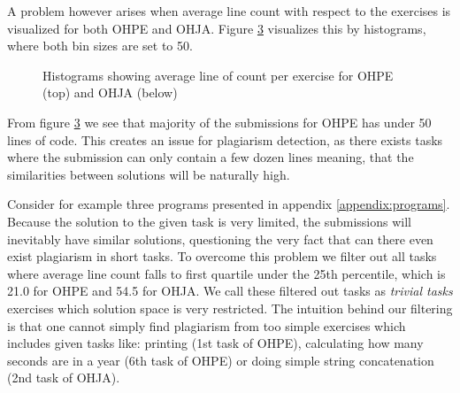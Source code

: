 \newpage

A problem however arises when average line count with respect to the exercises is visualized for both OHPE and OHJA. Figure \ref{fig-hists} visualizes this by histograms, where both bin sizes are set to 50. 


\begin{figure}[!h]
\centering
\captionsetup[subfigure]{justification=centering}

\begin{subfigure}{\textwidth}
    \setlength\figureheight{5cm}
    \setlength\figurewidth{\textwidth}
    
    \label{fig-ohpeavgloc}
\end{subfigure}

\begin{subfigure}{\textwidth}
  \setlength\figureheight{5cm}
    \setlength\figurewidth{\textwidth}
    
    \label{fig-ohjaavgloc}
\end{subfigure}

\caption[Two histograms for corpora]{Histograms showing average line of count per exercise for OHPE (top) and OHJA (below)}
\label{fig-hists}
\end{figure}

\noindent
From figure \ref{fig-hists} we see that majority of the submissions for OHPE has under 50 lines of code. This creates an issue for plagiarism detection, as there exists tasks where the submission can only contain a few dozen lines meaning, that the similarities between solutions will be naturally high. 

Consider for example three programs presented in appendix \ref{appendix:programs}. Because the solution to the given task is very limited, the submissions will inevitably have similar solutions, questioning the very fact that can there even exist plagiarism in short tasks. To overcome this problem we filter out all tasks where average line count falls to first quartile \ie under the 25th percentile, which is 21.0 for OHPE and 54.5 for OHJA. We call these filtered out tasks as \emph{trivial tasks} \ie exercises which solution space is very restricted. The intuition behind our filtering is that one cannot simply find plagiarism from too simple exercises which includes given tasks like: printing  (1st task of OHPE), calculating how many seconds are in a year (6th task of OHPE) or doing simple string concatenation (2nd task of OHJA). 


\newpage

